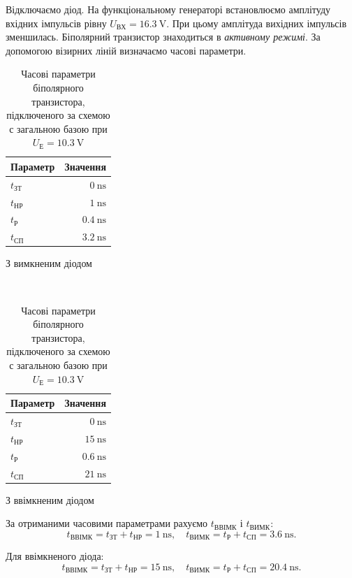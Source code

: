 \documentclass[a4paper,oneside,DIV=10,12pt]{scrartcl}
\begin{document}
		Відключаємо діод. На функціональному генераторі встановлюємо амплітуду вхідних імпульсів рівну $U_{\text{ВХ}} = \SI{16,3}{\volt}$. При цьому амплітуда вихідних імпульсів зменшилась. Біполярний транзистор знаходиться в \emph{активному режимі}. За допомогою візирних ліній визначаємо часові параметри.
		
		\begin{table}[H]
		\centering
			\begin{subtable}[h]{0.4\textwidth}
			\centering
				\begin{tabular}{lr}
				\toprule
				Параметр & Значення\\
				\midrule
				$t_{\text{ЗТ}}$ & $\SI{0}{\nano\second}$\\
				$t_{\text{НР}}$ & $\SI{1}{\nano\second}$\\
				$t_{\text{Р}}$ & $\SI{0,4}{\nano\second}$\\
				$t_{\text{СП}}$ & $\SI{3,2}{\nano\second}$\\
				\bottomrule
				\end{tabular}
				\caption{З вимкненим діодом}
			\end{subtable}
			~
			\begin{subtable}[h]{0.4\textwidth}
			\centering
				\begin{tabular}{lr}
				\toprule
				Параметр & Значення\\
				\midrule
				$t_{\text{ЗТ}}$ & $\SI{0}{\nano\second}$\\
				$t_{\text{НР}}$ & $\SI{15}{\nano\second}$\\
				$t_{\text{Р}}$ & $\SI{0,6}{\nano\second}$\\
				$t_{\text{СП}}$ & $\SI{21}{\nano\second}$\\
				\bottomrule
				\end{tabular}
				\caption{З ввімкненим діодом}
			\end{subtable}
		\caption{Часові параметри біполярного транзистора, підключеного за схемою с загальною базою при $U_{\text{Е}} = \SI{10,3}{\volt}$}
		\end{table}
		
		За отриманими часовими параметрами рахуємо $t_{\text{ВВІМК}}$ і $t_{\text{ВИМК}}$:
		\[
			t_{\text{ВВІМК}} = t_{\text{ЗТ}} + t_{\text{НР}} = \SI{1}{\nano\second}, \quad t_{\text{ВИМК}} = t_{\text{Р}} + t_{\text{СП}} = \SI{3,6}{\nano\second}.
		\]
		
		Для ввімкненого діода:
		\[
			t_{\text{ВВІМК}} = t_{\text{ЗТ}} + t_{\text{НР}} = \SI{15}{\nano\second}, \quad t_{\text{ВИМК}} = t_{\text{Р}} + t_{\text{СП}} = \SI{20,4}{\nano\second}.
		\]
		
\end{document}
